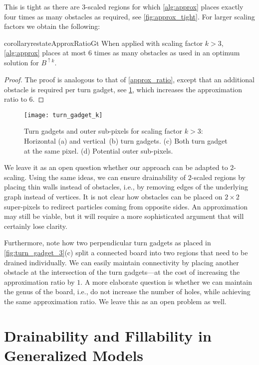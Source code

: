 \documentclass[a4paper,UKenglish,cleveref,thm-restate]{lipics-v2021}
\newcommand{\bScale}[2][k]{\ensuremath{{#2}^{\uparrow {#1}}}}
\begin{document}
This is tight as there are $3$-scaled regions for which \cref{alg:approx} places exactly four times as many obstacles as required, see \cref{fig:approx_tight}.
For larger scaling factors we obtain the following:

\begin{restatable}{corollary}{restateApproxRatioGt}\label{approxratiogt}
When applied with scaling factor $k > 3$, \cref{alg:approx} places at most $6$
times as many obstacles as used in an optimum solution for $\bScale[k]{B}$.
\end{restatable}
\begin{proof}
    The proof is analogous to that of \cref{approx_ratio}, except that an additional
    obstacle is required per turn gadget, see \cref{fig:turn_gadget_k}, which
    increases the approximation ratio to 6.
\end{proof}

\begin{figure}[htb]
    \centering
    \texttt{[image: turn\_gadget\_k]}\caption{Turn gadgets and outer sub-pixels for scaling factor $k > 3$:
    Horizontal (a) and vertical~(b) turn gadgets. (c) Both turn gadget at the same pixel. (d) Potential outer sub-pixels.}\label{fig:turn_gadget_k}
\end{figure}

We leave it as an open question whether our approach can be adapted to
$2$-scaling. Using the same ideas, we can ensure drainability of $2$-scaled
regions by placing thin walls instead of obstacles, i.e., by removing edges of
the underlying graph instead of vertices. It is not clear how obstacles can be
placed on $2 \times 2$ super-pixels to redirect particles coming from opposite
sides. An approximation may still be viable, but it will require a more
sophisticated argument that will certainly lose clarity.

Furthermore, note how two perpendicular turn gadgets as placed
in \cref{fig:turn_gadget_3}(c) split a connected board into two regions that
need to be drained individually. We can easily maintain connectivity by placing
another obstacle at the intersection of the turn gadgets---at the cost of
increasing the approximation ratio by $1$. A more elaborate question is whether
we can maintain the genus of the board, i.e., do not increase the number of
holes, while achieving the same approximation ratio. We leave this as an open
problem as well.
      \section{Drainability and Fillability in Generalized Models}\label{sec:models}
\end{document}
